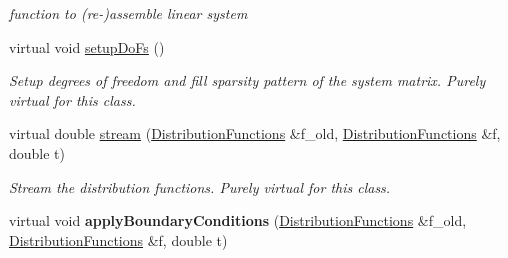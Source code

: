 \begin{DoxyCompactItemize}
\begin{DoxyCompactList}\small\item\em function to (re-\/)assemble linear system \item\end{DoxyCompactList}\item 
\hypertarget{classnatrium_1_1SemiLagrangian_a29408988807e9fbe24c8900c0e6bcf00}{
virtual void \hyperlink{classnatrium_1_1SemiLagrangian_a29408988807e9fbe24c8900c0e6bcf00}{setupDoFs} ()}
\label{classnatrium_1_1SemiLagrangian_a29408988807e9fbe24c8900c0e6bcf00}

\begin{DoxyCompactList}\small\item\em Setup degrees of freedom and fill sparsity pattern of the system matrix. Purely virtual for this class. \item\end{DoxyCompactList}\item 
virtual double \hyperlink{classnatrium_1_1SemiLagrangian_a03956c49c0bd288340b734f2fa9aad3c}{stream} (\hyperlink{classnatrium_1_1DistributionFunctions}{DistributionFunctions} \&f\_\-old, \hyperlink{classnatrium_1_1DistributionFunctions}{DistributionFunctions} \&f, double t)
\begin{DoxyCompactList}\small\item\em Stream the distribution functions. Purely virtual for this class. \item\end{DoxyCompactList}\item 
\hypertarget{classnatrium_1_1SemiLagrangian_a731b3834c039ba6bc07a5ee0e51f8e4c}{
virtual void {\bfseries applyBoundaryConditions} (\hyperlink{classnatrium_1_1DistributionFunctions}{DistributionFunctions} \&f\_\-old, \hyperlink{classnatrium_1_1DistributionFunctions}{DistributionFunctions} \&f, double t)}
\label{classnatrium_1_1SemiLagrangian_a731b3834c039ba6bc07a5ee0e51f8e4c}


\end{DoxyCompactItemize}
